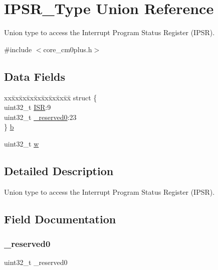 \hypertarget{union_i_p_s_r___type}{}\section{I\+P\+S\+R\+\_\+\+Type Union Reference}
\label{union_i_p_s_r___type}


Union type to access the Interrupt Program Status Register (I\+P\+SR).  




{\ttfamily \#include $<$core\+\_\+cm0plus.\+h$>$}

\subsection*{Data Fields}
\begin{DoxyCompactItemize}
\item 
\begin{tabbing}
xx\=xx\=xx\=xx\=xx\=xx\=xx\=xx\=xx\=\kill
struct \{\\
\>uint32\_t \mbox{\hyperlink{union_i_p_s_r___type_ad502ba7dbb2aab5f87c782b28f02622d}{ISR}}:9\\
\>uint32\_t \mbox{\hyperlink{union_i_p_s_r___type_ac8a6a13838a897c8d0b8bc991bbaf7c1}{\_reserved0}}:23\\
\} \mbox{\hyperlink{union_i_p_s_r___type_a42e56daeef77340dea5ecca578bc9179}{b}}\\

\end{tabbing}\item 
uint32\+\_\+t \mbox{\hyperlink{union_i_p_s_r___type_ad0fb62e7a08e70fc5e0a76b67809f84b}{w}}
\end{DoxyCompactItemize}


\subsection{Detailed Description}
Union type to access the Interrupt Program Status Register (I\+P\+SR). 

\subsection{Field Documentation}
\mbox{\label{union_i_p_s_r___type_ac8a6a13838a897c8d0b8bc991bbaf7c1}} 
\subsubsection{\texorpdfstring{\_reserved0}{\_reserved0}}
{\footnotesize\ttfamily uint32\+\_\+t \+\_\+reserved0}

